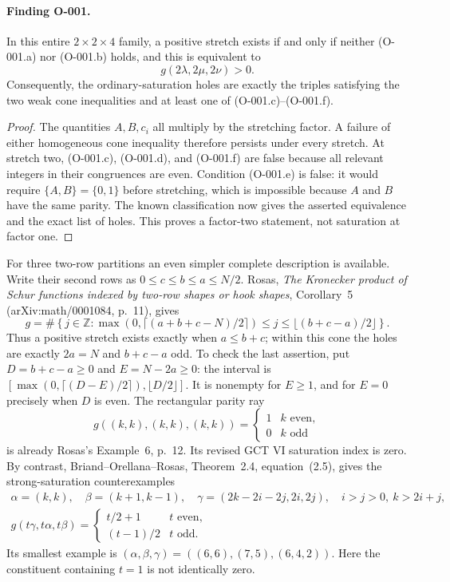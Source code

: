 \paragraph{Finding O-001.}
In this entire $2\times2\times4$ family, a positive stretch exists if and
only if neither (O-001.a) nor (O-001.b) holds, and this is equivalent to
\[
                         g(2\lambda,2\mu,2\nu)>0.
\]
Consequently, the ordinary-saturation holes are exactly the triples
satisfying the two weak cone inequalities and at least one of
(O-001.c)--(O-001.f).

\begin{proof}
The quantities $A,B,c_i$ all multiply by the stretching factor.  A failure
of either homogeneous cone inequality therefore persists under every
stretch.  At stretch two, (O-001.c), (O-001.d), and (O-001.f) are false
because all relevant integers in their congruences are even.  Condition
(O-001.e) is false: it would require $\{A,B\}=\{0,1\}$ before stretching,
which is impossible because $A$ and $B$ have the same parity.  The known
classification now gives the asserted equivalence and the exact list of
holes.  This proves a factor-two statement, not saturation at factor one.
\end{proof}

For three two-row partitions an even simpler complete description is
available.  Write their second rows as $0\leq c\leq b\leq a\leq N/2$.
Rosas, \emph{The Kronecker product of Schur functions indexed by two-row
shapes or hook shapes}, Corollary~5 (arXiv:math/0001084, p.~11), gives
\[
 g=\#\left\{j\in\mathbb Z:
 \max(0,\lceil(a+b+c-N)/2\rceil)\leq j
                  \leq\lfloor(b+c-a)/2\rfloor\right\}.
\]
Thus a positive stretch exists exactly when $a\leq b+c$; within this cone
the holes are exactly $2a=N$ and $b+c-a$ odd.  To check the last assertion,
put $D=b+c-a\geq0$ and $E=N-2a\geq0$: the interval is
$[\max(0,\lceil(D-E)/2\rceil),\lfloor D/2\rfloor]$.
It is nonempty for $E\geq1$, and for $E=0$ precisely when $D$ is even.
The rectangular parity ray
\[
            g((k,k),(k,k),(k,k))=\begin{cases}1&k\text{ even},\\0&k\text{ odd}
                                      \end{cases}
\]
is already Rosas's Example~6, p.~12. Its revised GCT VI saturation index
is zero.  By contrast, Briand--Orellana--Rosas, Theorem~2.4,
equation~(2.5), gives the strong-saturation counterexamples
\[
\begin{gathered}
 \alpha=(k,k),\quad\beta=(k+1,k-1),\quad
 \gamma=(2k-2i-2j,2i,2j),\quad i>j>0,\ k>2i+j,\\
 g(t\gamma,t\alpha,t\beta)=
 \begin{cases}t/2+1&t\text{ even},\\(t-1)/2&t\text{ odd}.
 \end{cases}
\end{gathered}
\]
Its smallest example is $(\alpha,\beta,\gamma)=((6,6),(7,5),(6,4,2))$.
Here the constituent containing $t=1$ is not identically zero.

